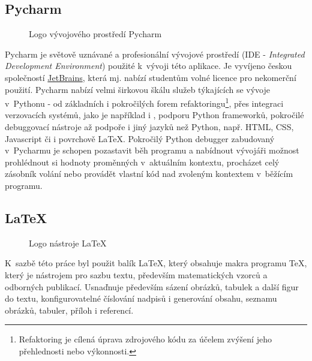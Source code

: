 \subsection{Pycharm}

\begin{figure}
	\centering
	
	\caption{Logo vývojového prostředí Pycharm}
\end{figure}

\begin{sloppypar}
	Pycharm je světově uznávané a profesionální vývojové prostředí (IDE - \emph{Integrated Development Environment}) použité k~vývoji této aplikace. Je vyvíjeno českou společností \href{https://www.jetbrains.com/}{JetBrains}, která mj. nabízí studentům volné licence pro nekomerční použití. Pycharm nabízí velmi širkovou škálu služeb týkajících se vývoje v~Pythonu - od základních i pokročilých forem refaktoringu\footnote{Refaktoring je cílená úprava zdrojového kódu za účelem zvýšení jeho přehlednosti nebo výkonnosti.}, přes integraci verzovacích systémů, jako je například i , podporu Python frameworků, pokročilé debuggovací nástroje až podpoře i jiný jazyků než Python, např. HTML, CSS, Javascript či i povrchově \LaTeX{}. Pokročilý Python debugger zabudovaný v~Pycharmu je schopen pozastavit běh programu a nabídnout vývojáři možnost prohlédnout si hodnoty proměnných v~aktuálním kontextu, procházet celý zásobník volání nebo provádět vlastní kód nad zvoleným kontextem v~běžícím programu.
\end{sloppypar}

\subsection{\LaTeX}

\begin{figure}
	\centering
	
	\caption{Logo nástroje \LaTeX}
\end{figure}

K~sazbě této práce byl použit balík \LaTeX, který obsahuje makra programu \TeX, který je nástrojem pro sazbu textu, především matematických vzorců a odborných publikací. Usnaďnuje především sázení obrázků, tabulek a další figur do textu, konfigurovatelné číslování nadpisů i generování obsahu, seznamu obrázků, tabuler, příloh i referencí.
